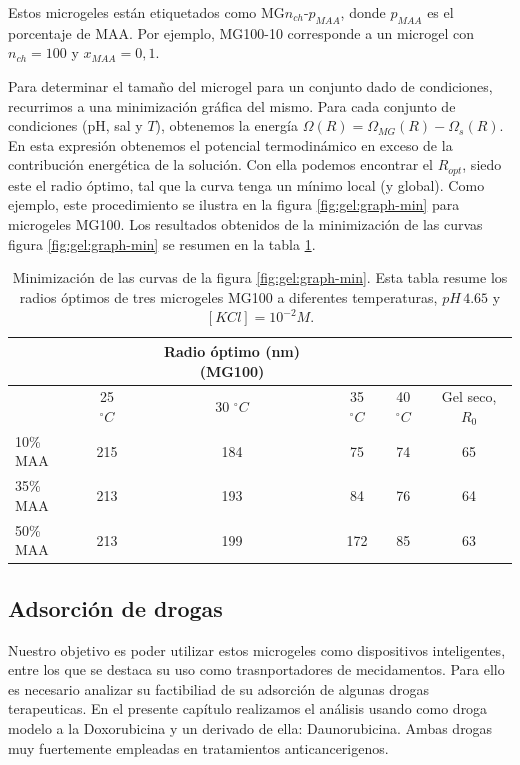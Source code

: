 Estos microgeles est\'an etiquetados como MG$n_{ch}$-$p_{MAA}$, donde $p_{MAA}$ es el porcentaje de MAA.
Por ejemplo, MG100-10 corresponde a un  microgel con $n_{ch}=100$ y $x_{MAA}=0,1$.


Para determinar el tama\~no del microgel para un conjunto dado de condiciones, recurrimos a una minimizaci\'on gr\'afica del mismo.
Para cada conjunto de condiciones (pH, sal y $T$), obtenemos la energ\'ia $\Omega(R)=\Omega_{MG}(R)-\Omega_{s}(R)$. En esta expresi\'on obtenemos el potencial termodin\'amico en exceso de la contribuci\'on energ\'etica de la soluci\'on.
Con ella podemos encontrar el $R_{opt }$, siedo este el radio \'optimo, tal que la curva tenga un m\'inimo local (y global).
Como ejemplo, este procedimiento se ilustra en la figura \ref{fig:gel:graph-min} para microgeles MG100.
Los resultados obtenidos de la minimizaci\'on de las curvas figura \ref{fig:gel:graph-min} se resumen en la tabla \ref{table:gel:optimal-R}.

\begin{table}[!htb]
\centering
\small
  \begin{tabular}{|lccccc|}
   \hline %
    	&&   Radio \'optimo (nm)(MG100) & && \\
    	\hline
      & {25 $^\circ C$} & {30 $^\circ C$} & {35 $^\circ C$} & {40 $^\circ C$} & {Gel seco, $R_0$} \\
      \hline
    10\% MAA & 215 &  184 &  75  &  74 & 65\\
    35\% MAA &  213 &  193 &  84 & 76 & 64\\
    50\% MAA &  213 & 199 &  172 & 85 & 63\\
    \hline
  \end{tabular}
 \caption{Minimizaci\'on de las curvas de la  figura \ref{fig:gel:graph-min}.
 	Esta tabla resume los radios \'optimos de tres microgeles MG100 a diferentes temperaturas, $pH\,4.65$ y $[KCl]=10^{-2}M$.}
\label{table:gel:optimal-R} 
\end{table}


\subsection{Adsorci\'on de drogas}\label{sec:gel:adsorcion}

Nuestro objetivo es poder utilizar estos microgeles como dispositivos inteligentes, entre los que se destaca su uso como trasnportadores de mecidamentos. Para ello es necesario analizar su factibiliad de su adsorci\'on de algunas drogas terapeuticas. En el presente cap\'itulo realizamos el an\'alisis usando como droga modelo a la Doxorubicina y un derivado de ella: Daunorubicina. Ambas drogas muy fuertemente empleadas en tratamientos anticancerigenos. 

